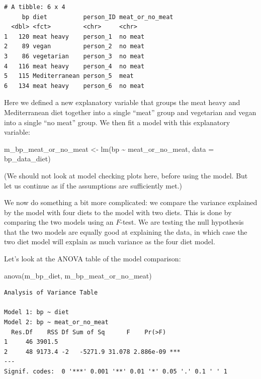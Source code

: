 \documentclass[
  letterpaper,
  8pt,
  a4paper]{book}
\newenvironment{Shaded}{\begin{snugshade}}{\end{snugshade}}
\newcommand{\AttributeTok}[1]{\textcolor[rgb]{0.40,0.45,0.13}{#1}}
\newcommand{\FunctionTok}[1]{\textcolor[rgb]{0.28,0.35,0.67}{#1}}
\newcommand{\NormalTok}[1]{\textcolor[rgb]{0.00,0.23,0.31}{#1}}
\newcommand{\OtherTok}[1]{\textcolor[rgb]{0.00,0.23,0.31}{#1}}
\newcommand{\SpecialCharTok}[1]{\textcolor[rgb]{0.37,0.37,0.37}{#1}}
\begin{document}
\begin{verbatim}
# A tibble: 6 x 4
     bp diet          person_ID meat_or_no_meat
  <dbl> <fct>         <chr>     <chr>          
1   120 meat heavy    person_1  no meat        
2    89 vegan         person_2  no meat        
3    86 vegetarian    person_3  no meat        
4   116 meat heavy    person_4  no meat        
5   115 Mediterranean person_5  meat           
6   134 meat heavy    person_6  no meat        
\end{verbatim}

Here we defined a new explanatory variable that groups the meat heavy
and Mediterranean diet together into a single ``meat'' group and
vegetarian and vegan into a single ``no meat'' group. We then fit a
model with this explanatory variable:

\begin{Shaded}
\begin{Highlighting}[]
\NormalTok{m\_bp\_meat\_or\_no\_meat }\OtherTok{\textless{}{-}} \FunctionTok{lm}\NormalTok{(bp }\SpecialCharTok{\textasciitilde{}}\NormalTok{ meat\_or\_no\_meat, }\AttributeTok{data =}\NormalTok{ bp\_data\_diet)}
\end{Highlighting}
\end{Shaded}

(We should not look at model checking plots here, before using the
model. But let us continue as if the assumptions are sufficiently met.)

We now do something a bit more complicated: we compare the variance
explained by the model with four diets to the model with two diets. This
is done by comparing the two models using an \(F\)-test. We are testing
the null hypothesis that the two models are equally good at explaining
the data, in which case the two diet model will explain as much variance
as the four diet model.

Let's look at the ANOVA table of the model comparison:

\begin{Shaded}
\begin{Highlighting}[]
\FunctionTok{anova}\NormalTok{(m\_bp\_diet, m\_bp\_meat\_or\_no\_meat)}
\end{Highlighting}
\end{Shaded}

\begin{verbatim}
Analysis of Variance Table

Model 1: bp ~ diet
Model 2: bp ~ meat_or_no_meat
  Res.Df    RSS Df Sum of Sq      F    Pr(>F)    
1     46 3901.5                                  
2     48 9173.4 -2   -5271.9 31.078 2.886e-09 ***
---
Signif. codes:  0 '***' 0.001 '**' 0.01 '*' 0.05 '.' 0.1 ' ' 1
\end{verbatim}
\end{document}

